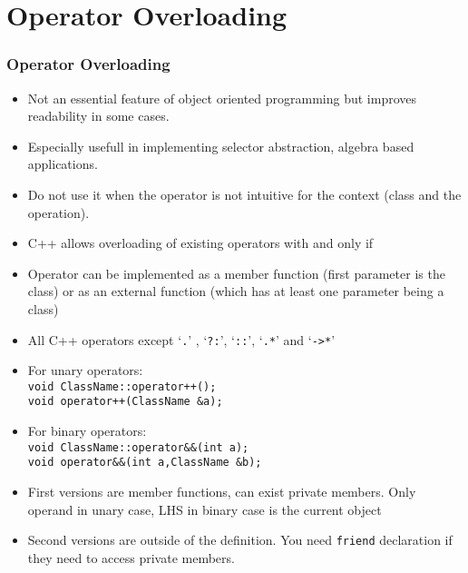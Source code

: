 \section{Operator Overloading}
\begin{frame}
\frametitle{Operator Overloading}
\begin{itemize}[<+->]
\item Not an essential feature of object oriented programming but improves
readability in some cases.
\item Especially usefull in implementing selector abstraction, algebra
based applications.
\item \alert{Do not use it when the operator is not intuitive for the context
(class and the operation).}
\item C++ allows overloading of existing operators with  and only if 
\item Operator can be implemented as a member function 
(first parameter is the class) or as an external function
(which has at least one parameter being a class)
\end{itemize}
\end{frame}

\begin{frame}
\begin{itemize}
\item All C++ operators except  `{\tt .}' , `{\tt ?:}', `{\tt ::}', `{\tt .*}' and `{\tt ->*}'
\item For unary operators:\\
	 \lstinline"void ClassName::operator++();"\\ 
	 \lstinline"void operator++(ClassName &a);"\\
\item For binary operators:\\
	 \lstinline"void ClassName::operator&&(int a);"\\
	 \lstinline"void operator&&(int a,ClassName &b);"\\
\item First versions are member functions, can exist private members. Only operand in unary
case, LHS in binary case is the current object
\item Second versions are outside of the definition. You need \lstinline!friend! declaration
	if they need to access private members.
\end{itemize}
\end{frame}

